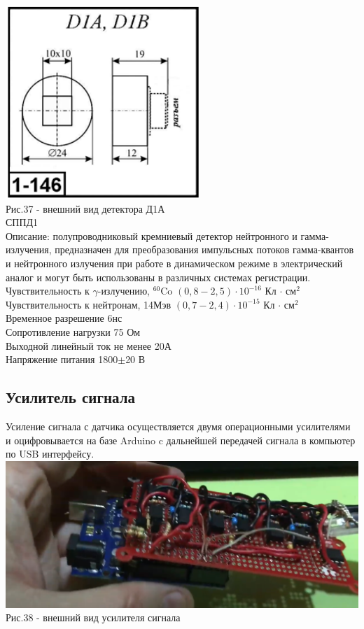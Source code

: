 \documentclass[11pt]{report}
\begin{document}
\includegraphics[scale=0.4]{d1a} \\
Рис.37 - внешний вид детектора Д1А\\

СППД1\\
Описание: полупроводниковый кремниевый детектор нейтронного и гамма-излучения, предназначен для преобразования импульсных потоков гамма-квантов и нейтронного излучения при работе в динамическом режиме в электрический аналог и могут быть использованы в различных системах регистрации. \\
Чувствительность к $\gamma$-излучению, $^{60}$Co $(0,8-2,5)\cdot 10^{-16}$ Кл $\cdot $ см$^2 $\\
Чувствительность к нейтронам, 14Мэв $(0,7-2,4)\cdot 10^{-15}$ Кл $\cdot $ см$^2 $ \\
Временное разрешение 6нс \\
Сопротивление нагрузки 75 Ом\\
Выходной линейный ток не менее 20А\\
Напряжение питания 1800$\pm$20 В \\

\subsection{Усилитель сигнала}
Усиление сигнала с датчика осуществляется двумя операционными усилителями и оцифровывается на базе Arduino c дальнейшей передачей сигнала в компьютер по USB интерфейсу. \\

\includegraphics[scale=0.18]{ust_f_1}\\
Рис.38 - внешний вид усилителя сигнала \\
\end{document}
